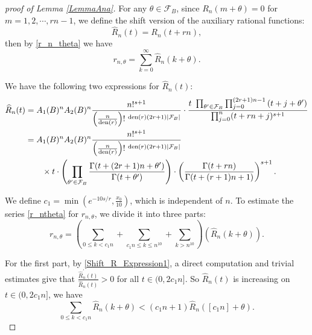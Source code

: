 \documentclass[11pt]{amsart}
\numberwithin{equation}{section}
\begin{document}
\smallskip
\begin{proof}[proof of Lemma \ref{LemmaAna}]
For any $\theta \in \mathcal{F}_B$, since $R_n(m+\theta) = 0 $ for $m=1,2,\cdots,rn-1$, we define the shift version of the auxiliary rational functions:
\[ \widehat{R}_{n}(t) = R_{n}(t+rn) ,\]
then by \eqref{r_n_theta} we have
\begin{equation}\label{r_ntheta}
r_{n,\theta}  = \sum_{k=0}^{\infty} \widehat{R}_{n}(k+\theta).
\end{equation}

We have the following two expressions for $\widehat{R}_{n}(t)$:
\begin{align}
\widehat{R}_{n}(t) &= A_1(B)^n A_2(B)^n \frac{n!^{s+1}}{\left( \frac{n}{{\rm den}(r)} \right)!~^{{\rm den}(r)(2r+1)|\mathcal{F}_B|}} \cdot \frac{ t ~ \prod_{\theta' \in \mathcal{F}_B} \prod_{j=0}^{(2r+1)n-1} \left(t+j+\theta' \right)}{ \prod_{j=0}^{n} (t+rn+j)^{s+1}} \label{Shift_R_Expression1} \\
&= A_1(B)^n A_2(B)^n \frac{n!^{s+1}}{\left( \frac{n}{{\rm den}(r)} \right)!~^{{\rm den}(r)(2r+1)|\mathcal{F}_B|}}  \nonumber\\
&\qquad \times t \cdot \left( \prod_{\theta' \in \mathcal{F}_B } \frac{\Gamma(t+(2r+1)n+\theta')}{\Gamma(t+\theta')} \right) \cdot  \left( \frac{\Gamma(t+rn)}{\Gamma(t+(r+1)n+1)} \right)^{s+1} \label{Shift_R_Expression2}.
\end{align}

We define $c_1 = \min(e^{-10s/r},\frac{x_0}{10})$, which is independent of $n$. To estimate the series \eqref{r_ntheta} for $r_{n,\theta}$, we divide it into three parts:
\[r_{n,\theta} = \left( \sum_{0 \leqslant k < c_1n} + \sum_{c_1 n \leqslant k \leqslant n^{10}} + \sum_{k>n^{10}} \right) \left( \widehat{R}_{n}(k+\theta) \right).\]

For the first part, by \eqref{Shift_R_Expression1}, a direct computation and trivial estimates give that $ \frac{\widehat{R}_{n}^{\prime}(t)}{\widehat{R}_{n}(t)} > 0$ for all $t \in(0,2c_1 n]$. So $\widehat{R}_{n}(t)$ is increasing on $t \in (0,2c_1 n]$, we have
\begin{equation}\label{firstpart}
\sum_{0 \leqslant k < c_1n} \widehat{R}_{n}(k+\theta) < \left( c_{1}n+1 \right)\widehat{R}_{n}([c_{1}n]+\theta).
\end{equation}


\end{proof}
\end{document}
